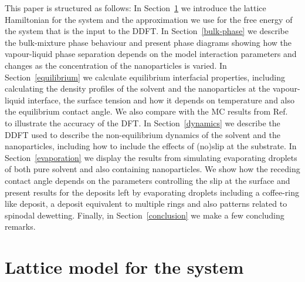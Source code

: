 \documentclass[journal=langd5,manuscript=article]{achemso}
\begin{document}
{ This paper is structured as follows: In Section~\ref{methodology} we introduce the lattice Hamiltonian for the system and the approximation we use for the free energy of the system that is the input to the DDFT. In Section~\ref{bulk-phase} we describe the bulk-mixture phase behaviour and present phase diagrams showing how the vapour-liquid phase separation depends on the model interaction parameters and changes as the concentration of the nanoparticles is varied. In Section~\ref{equilibrium} we calculate equilibrium interfacial properties, including calculating the density profiles of the solvent and the nanoparticles at the vapour-liquid interface, the surface tension and how it depends on temperature and also the equilibrium contact angle. We also compare with the MC results from Ref.\  to illustrate the accuracy of the DFT. In Section~\ref{dynamics} we describe the DDFT used to describe the non-equilibrium dynamics of the solvent and the nanoparticles, including how to include the effects of (no)slip at the substrate. In Section~\ref{evaporation} we display the results from simulating evaporating droplets of both pure solvent and also containing nanoparticles. We show how the receding contact angle depends on the parameters controlling the slip at the surface and present results for the deposits left by evaporating droplets including a coffee-ring like deposit, a deposit equivalent to multiple rings and also patterns related to spinodal dewetting. Finally, in Section~\ref{conclusion} we make a few concluding remarks.}

\section{Lattice model for the system}\label{methodology}
\end{document}

